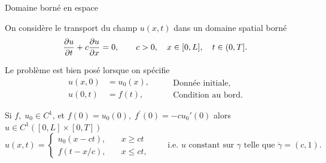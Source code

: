 \documentclass[aspectratio=169, french]{beamer}
\begin{document}
\begin{frame}{Domaine borné en espace}
	
On considère le transport du champ $u(x, t)$ dans un domaine spatial borné
\begin{equation*}
	\diffp{u}{t} + c \diffp{u}{x} = 0, \qquad c > 0, \quad  x \in [0, L], \quad t \in (0, T]. 
\end{equation*}
		
		Le problème est bien posé lorsque on spécifie 
		\begin{equation*}
			\begin{aligned}
			u(x, 0) &= u_0(x),\\
			u(0, t) &= f(t),
			\end{aligned} \qquad
			\begin{aligned}
			\text{Donnée initiale}, \\
			\text{Condition au bord}.
			\end{aligned}
		\end{equation*}
	\begin{tcolorbox}[title = Solution analytique, coltitle=white]
Si $f, \; u_0 \in C^{1}$, et $f(0) = u_0(0), \; f^{'}(0) = -c u_0{'}(0)$
alors  $u \in C^{1}([0, L]\times [0, T])$ 
\begin{equation*}
	u(x, t) = \begin{cases}
		u_0(x - ct), \quad &x\ge ct\\
		f(t-x/c), \quad &x\le ct,
	\end{cases}
	\qquad\text{i.e. $u$ constant sur $\gamma$ telle que $\dot{\gamma} = (c ,1)$.}
\end{equation*}
\end{tcolorbox}
	
\end{frame}
\end{document}
